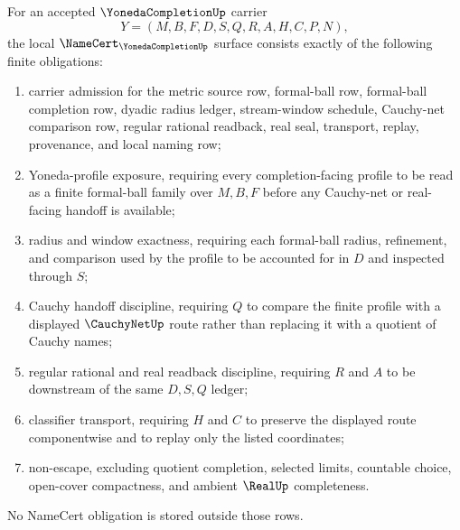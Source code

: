 \begin{theorem}
\label{thm:yoneda-completion-namecert-obligations}
For an accepted $\YonedaCompletionUp$ carrier
$$
Y=(M,B,F,D,S,Q,R,A,H,C,P,N),
$$
the local $\NameCert_{\YonedaCompletionUp}$ surface consists exactly of the following finite obligations:
\begin{enumerate}
\item carrier admission for the metric source row, formal-ball row, formal-ball completion row, dyadic radius ledger, stream-window schedule, Cauchy-net comparison row, regular rational readback, real seal, transport, replay, provenance, and local naming row;
\item Yoneda-profile exposure, requiring every completion-facing profile to be read as a finite formal-ball family over $M,B,F$ before any Cauchy-net or real-facing handoff is available;
\item radius and window exactness, requiring each formal-ball radius, refinement, and comparison used by the profile to be accounted for in $D$ and inspected through $S$;
\item Cauchy handoff discipline, requiring $Q$ to compare the finite profile with a displayed $\CauchyNetUp$ route rather than replacing it with a quotient of Cauchy names;
\item regular rational and real readback discipline, requiring $R$ and $A$ to be downstream of the same $D,S,Q$ ledger;
\item classifier transport, requiring $H$ and $C$ to preserve the displayed route componentwise and to replay only the listed coordinates;
\item non-escape, excluding quotient completion, selected limits, countable choice, open-cover compactness, and ambient $\RealUp$ completeness.
\end{enumerate}
No NameCert obligation is stored outside those rows.
\end{theorem}
